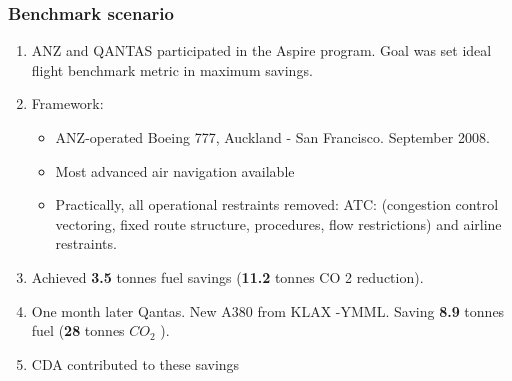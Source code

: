 \documentclass{beamer}
\begin{document}
\begin{frame}
\frametitle{Benchmark scenario}

\begin{enumerate}[1]

\item ANZ and QANTAS participated in the Aspire program.  Goal was set ideal flight benchmark metric in maximum savings.

\item Framework: 
\begin{itemize}
\item ANZ-operated Boeing 777, Auckland - San Francisco. September 2008.
\item Most advanced air navigation available
\item Practically, all operational restraints removed:  ATC: (congestion control vectoring, fixed route structure, procedures, flow restrictions) and airline restraints. 
\end{itemize}

\item Achieved \textbf{3.5} tonnes fuel savings (\textbf{11.2} tonnes CO 2 reduction). 
\item One month later Qantas. New A380 from KLAX -YMML. Saving \textbf{8.9} tonnes fuel (\textbf{28} tonnes $CO_2$ ). 
\item CDA contributed to these savings
\end{enumerate}

\end{frame}



\end{document}
